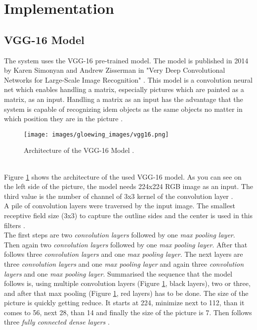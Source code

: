 \section{Implementation}
\label{sec:implementation}

\subsection{VGG-16 Model}
\label{subsec:vgg16}
The system uses the VGG-16 pre-trained model. The model is published in 2014 by Karen Simonyan and Andrew Zisserman in "Very Deep Convolutional Networks for Large-Scale Image Recognition" \cite{simonyan2014deep}. This model is a convolution neural net which enables handling a matrix, especially pictures which are painted as a matrix, as an input. Handling a matrix as an input has the advantage that the system is capable of recognizing idem objects as the same objects no matter in which position they are in the picture \cite{Becker2019}.
\begin{figure}
\sidecaption
\texttt{[image: images/gloewing\_images/vgg16.png]}
\caption{Architecture of the VGG-16 Model \cite{Hassan2018}.}
\label{fig:vgg16}
\end{figure}\\
Figure \ref{fig:vgg16} shows the architecture of the used VGG-16 model. As you can see on the left side of the picture, the model needs 224x224 RGB image as an input. The third value is the number of channel of 3x3 kernel of the convolution layer \cite{Hassan2018}.\\
A pile of convolution layers were traversed by the input image. The smallest receptive field size (3x3) to capture the outline sides and the center is used in this filters \cite{Hassan2018}.\\
The first steps are two \textit{convolution layers} followed by one \textit{max pooling layer}. Then again two \textit{convolution layers} followed by one \textit{max pooling layer}. After that follows three \textit{convolution layers} and one \textit{max pooling layer}. The next layers are three \textit{convolution layers} and one \textit{max pooling layer} and again three \textit{convolution layers} and one \textit{max pooling layer}. Summarised the sequence that the model follows is, using multiple convolution layers (Figure \ref{fig:vgg16}, black layers), two or three, and after that max pooling (Figure \ref{fig:vgg16}, red layers) has to be done. The size of the picture is quickly getting reduce. It starts at 224, minimize next to 112, than it comes to 56, next 28, than 14 and finally the size of the picture is 7. Then follows three \textit{fully connected dense layers} \cite{Hassan2018}.\\
